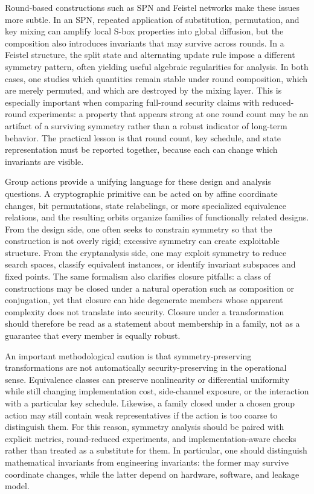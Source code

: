 Round-based constructions such as SPN and Feistel networks make these issues more subtle. In an SPN, repeated application of substitution, permutation, and key mixing can amplify local S-box properties into global diffusion, but the composition also introduces invariants that may survive across rounds. In a Feistel structure, the split state and alternating update rule impose a different symmetry pattern, often yielding useful algebraic regularities for analysis. In both cases, one studies which quantities remain stable under round composition, which are merely permuted, and which are destroyed by the mixing layer. This is especially important when comparing full-round security claims with reduced-round experiments: a property that appears strong at one round count may be an artifact of a surviving symmetry rather than a robust indicator of long-term behavior. The practical lesson is that round count, key schedule, and state representation must be reported together, because each can change which invariants are visible.

Group actions provide a unifying language for these design and analysis questions. A cryptographic primitive can be acted on by affine coordinate changes, bit permutations, state relabelings, or more specialized equivalence relations, and the resulting orbits organize families of functionally related designs. From the design side, one often seeks to constrain symmetry so that the construction is not overly rigid; excessive symmetry can create exploitable structure. From the cryptanalysis side, one may exploit symmetry to reduce search spaces, classify equivalent instances, or identify invariant subspaces and fixed points. The same formalism also clarifies closure pitfalls: a class of constructions may be closed under a natural operation such as composition or conjugation, yet that closure can hide degenerate members whose apparent complexity does not translate into security. Closure under a transformation should therefore be read as a statement about membership in a family, not as a guarantee that every member is equally robust.

An important methodological caution is that symmetry-preserving transformations are not automatically security-preserving in the operational sense. Equivalence classes can preserve nonlinearity or differential uniformity while still changing implementation cost, side-channel exposure, or the interaction with a particular key schedule. Likewise, a family closed under a chosen group action may still contain weak representatives if the action is too coarse to distinguish them. For this reason, symmetry analysis should be paired with explicit metrics, round-reduced experiments, and implementation-aware checks rather than treated as a substitute for them. In particular, one should distinguish mathematical invariants from engineering invariants: the former may survive coordinate changes, while the latter depend on hardware, software, and leakage model.

